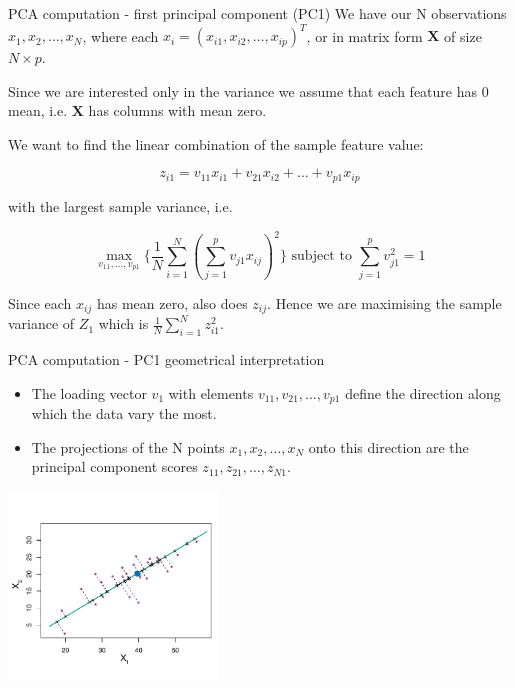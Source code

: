\documentclass[notes]{beamer}          %
\begin{document}
\begin{frame}{PCA computation - first principal component (PC1)}
We have our N observations $x_1, x_2,  \dots, x_N$, where each $x_i= (x_{i1}, x_{i2}, \dots, x_{ip})^T$, or in matrix form $\mathbf X$ of size $N \times p$.

\vspace{2mm} 

Since we are interested only in the variance we assume that each feature has 0 mean, i.e. $\mathbf X$  has columns with mean zero.

\vspace{2mm} 

We want to find the linear combination of the sample feature value:

\begin{equation*}
	z_{i1} =v_{11}x_{i1} + v_{21}x_{i2} + \dots + v_{p1}x_{ip}
\end{equation*}

with the largest sample variance, i.e.

\begin{equation*}
\max_{v_{11}, \dots, v_{p1}}  \{\frac{1}{N} \sum_{i=1}^N (\sum_{j=1}^p v_{j1}x_{ij})^2\} \text{     subject to   } \sum_{j=1}^{p}v_{j1}^2=1
\end{equation*}

Since each $x_{ij}$ has mean zero, also does $z_{ij}$. Hence we are maximising the sample variance of $Z_{1}$ which is $\frac{1}{N}\sum_{i=1}^N z_{i1}^2$.

\end{frame}

\begin{frame}{PCA computation - PC1 geometrical interpretation}
\begin{itemize}
\item The loading vector $v_1$ with elements $v_{11}, v_{21}, \dots, v_{p1}$ define the direction along which the data vary the most.
\item The projections of the N points $x_1, x_2, \dots, x_N$ onto this direction are the principal component scores $z_{11}, z_{21}, \dots, z_{N1}$.
\end{itemize}

\begin{center}
\includegraphics[height=5cm]{../figures/week_6/PCA_geometrical.pdf}  
\end{center}
\end{frame}
\end{document}
